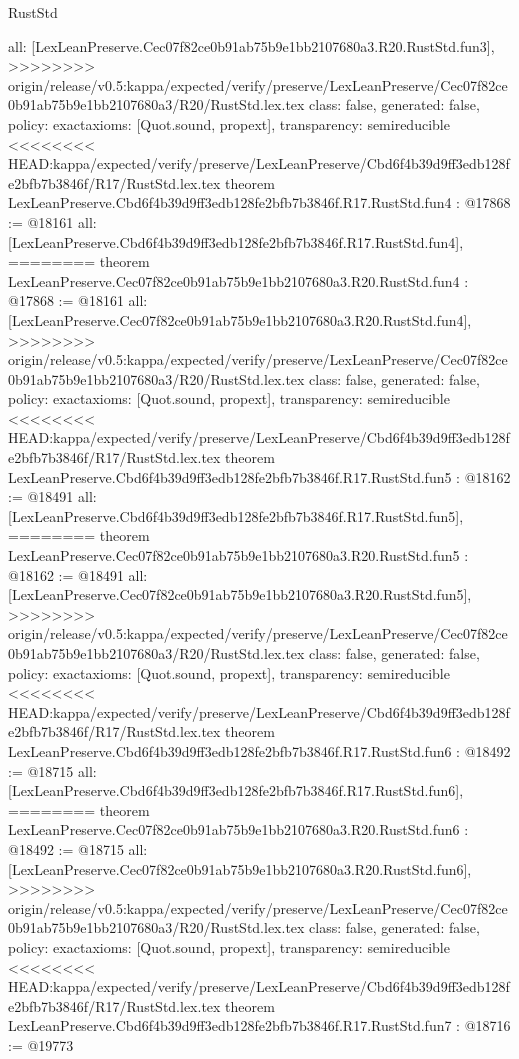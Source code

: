 \begin{lexlean}{RustStd}
\begin{coremodule}
{\begin{coremodule}
{{{{{{{  all: [LexLeanPreserve.Cec07f82ce0b91ab75b9e1bb2107680a3.R20.RustStd.fun3],
>>>>>>>> origin/release/v0.5:kappa/expected/verify/preserve/LexLeanPreserve/Cec07f82ce0b91ab75b9e1bb2107680a3/R20/RustStd.lex.tex
  class: false,
  generated: false,
  policy: exact{axioms: [Quot.sound, propext]},
  transparency: semireducible
}
<<<<<<<< HEAD:kappa/expected/verify/preserve/LexLeanPreserve/Cbd6f4b39d9ff3edb128fe2bfb7b3846f/R17/RustStd.lex.tex
theorem LexLeanPreserve.Cbd6f4b39d9ff3edb128fe2bfb7b3846f.R17.RustStd.fun4 : @17868 := @18161 {
  all: [LexLeanPreserve.Cbd6f4b39d9ff3edb128fe2bfb7b3846f.R17.RustStd.fun4],
========
theorem LexLeanPreserve.Cec07f82ce0b91ab75b9e1bb2107680a3.R20.RustStd.fun4 : @17868 := @18161 {
  all: [LexLeanPreserve.Cec07f82ce0b91ab75b9e1bb2107680a3.R20.RustStd.fun4],
>>>>>>>> origin/release/v0.5:kappa/expected/verify/preserve/LexLeanPreserve/Cec07f82ce0b91ab75b9e1bb2107680a3/R20/RustStd.lex.tex
  class: false,
  generated: false,
  policy: exact{axioms: [Quot.sound, propext]},
  transparency: semireducible
}
<<<<<<<< HEAD:kappa/expected/verify/preserve/LexLeanPreserve/Cbd6f4b39d9ff3edb128fe2bfb7b3846f/R17/RustStd.lex.tex
theorem LexLeanPreserve.Cbd6f4b39d9ff3edb128fe2bfb7b3846f.R17.RustStd.fun5 : @18162 := @18491 {
  all: [LexLeanPreserve.Cbd6f4b39d9ff3edb128fe2bfb7b3846f.R17.RustStd.fun5],
========
theorem LexLeanPreserve.Cec07f82ce0b91ab75b9e1bb2107680a3.R20.RustStd.fun5 : @18162 := @18491 {
  all: [LexLeanPreserve.Cec07f82ce0b91ab75b9e1bb2107680a3.R20.RustStd.fun5],
>>>>>>>> origin/release/v0.5:kappa/expected/verify/preserve/LexLeanPreserve/Cec07f82ce0b91ab75b9e1bb2107680a3/R20/RustStd.lex.tex
  class: false,
  generated: false,
  policy: exact{axioms: [Quot.sound, propext]},
  transparency: semireducible
}
<<<<<<<< HEAD:kappa/expected/verify/preserve/LexLeanPreserve/Cbd6f4b39d9ff3edb128fe2bfb7b3846f/R17/RustStd.lex.tex
theorem LexLeanPreserve.Cbd6f4b39d9ff3edb128fe2bfb7b3846f.R17.RustStd.fun6 : @18492 := @18715 {
  all: [LexLeanPreserve.Cbd6f4b39d9ff3edb128fe2bfb7b3846f.R17.RustStd.fun6],
========
theorem LexLeanPreserve.Cec07f82ce0b91ab75b9e1bb2107680a3.R20.RustStd.fun6 : @18492 := @18715 {
  all: [LexLeanPreserve.Cec07f82ce0b91ab75b9e1bb2107680a3.R20.RustStd.fun6],
>>>>>>>> origin/release/v0.5:kappa/expected/verify/preserve/LexLeanPreserve/Cec07f82ce0b91ab75b9e1bb2107680a3/R20/RustStd.lex.tex
  class: false,
  generated: false,
  policy: exact{axioms: [Quot.sound, propext]},
  transparency: semireducible
}
<<<<<<<< HEAD:kappa/expected/verify/preserve/LexLeanPreserve/Cbd6f4b39d9ff3edb128fe2bfb7b3846f/R17/RustStd.lex.tex
theorem LexLeanPreserve.Cbd6f4b39d9ff3edb128fe2bfb7b3846f.R17.RustStd.fun7 : @18716 := @19773 {
}}}}}}}}}}
\end{coremodule}}
\end{coremodule}
\end{lexlean}
